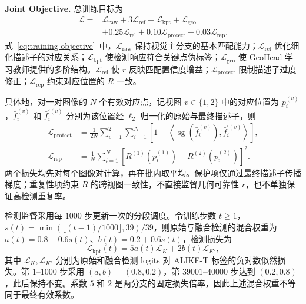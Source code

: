 \documentclass{article}
\begin{document}
\noindent\textbf{Joint Objective.} 总训练目标为
\begin{equation}
\begin{aligned}
\mathcal L={}&\mathcal L_{\mathrm{raw}}+3\mathcal L_{\mathrm{ref}}+\mathcal L_{\mathrm{kpt}}+\mathcal L_{\mathrm{geo}}\\
&+0.25\mathcal L_{\mathrm{rel}}+0.10\mathcal L_{\mathrm{protect}}+0.03\mathcal L_{\mathrm{rep}}.
\end{aligned}
\label{eq:training-objective}
\end{equation}
式~\eqref{eq:training-objective}~中，$\mathcal L_{\mathrm{raw}}$ 保持视觉主分支的基本匹配能力；$\mathcal L_{\mathrm{ref}}$ 优化细化描述子的对应关系；$\mathcal L_{\mathrm{kpt}}$ 使检测响应符合关键点伪标签；$\mathcal L_{\mathrm{geo}}$ 使 GeoHead 学习教师提供的多阶结构。$\mathcal L_{\mathrm{rel}}$ 使 $r$ 反映匹配置信度增益；$\mathcal L_{\mathrm{protect}}$ 限制描述子过度修正；$\mathcal L_{\mathrm{rep}}$ 约束对应位置的 $R$ 一致。

具体地，对一对图像的 $N$ 个有效对应点，记视图 $v\in\{1,2\}$ 中的对应位置为 $p_i^{(v)}$，$\bar f_i^{(v)}$ 和 $\bar f_i^{\prime(v)}$ 分别为该位置经 $\ell_2$ 归一化的原始与最终描述子，则
\begin{equation}
\begin{aligned}
\mathcal L_{\mathrm{protect}}&=\frac{1}{2N}\sum_{v=1}^{2}\sum_{i=1}^{N}
\left[1-\left\langle\operatorname{sg}(\bar f_i^{(v)}),\bar f_i^{\prime(v)}\right\rangle\right],\\
\mathcal L_{\mathrm{rep}}&=\frac{1}{N}\sum_{i=1}^{N}
\left[R^{(1)}(p_i^{(1)})-R^{(2)}(p_i^{(2)})\right]^2.
\end{aligned}
\label{eq:protect-repeatability}
\end{equation}
两个损失均先对每个图像对计算，再在批内取平均。保护项仅通过最终描述子传播梯度；重复性项约束 $R$ 的跨视图一致性，不直接监督几何可靠性 $r$，也不单独保证高检测重复率。

检测监督采用每 $1000$ 步更新一次的分段调度。令训练步数 $t\geq1$，$s(t)=\min(\lfloor(t-1)/1000\rfloor,39)/39$，则原始与融合检测的混合权重为 $a(t)=0.8-0.6s(t)$、$b(t)=0.2+0.6s(t)$，检测损失为
\begin{equation}
\mathcal L_{\mathrm{kpt}}(t)=5a(t)\mathcal L_{K}+2b(t)\mathcal L_{K'},
\label{eq:keypoint-schedule}
\end{equation}
其中 $\mathcal L_K,\mathcal L_{K'}$ 分别为原始和融合检测 logits 对 ALIKE-T 标签的负对数似然损失。第 $1$--$1000$ 步采用 $(a,b)=(0.8,0.2)$，第 $39001$--$40000$ 步达到 $(0.2,0.8)$，此后保持不变。系数 $5$ 和 $2$ 是两分支的固定损失倍率，因此上述混合权重不等同于最终有效系数。
\end{document}
